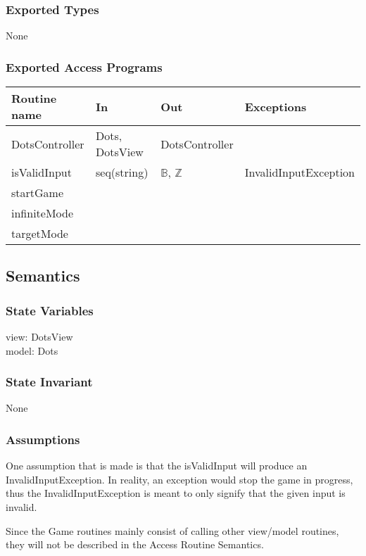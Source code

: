 \documentclass[12pt]{article}
\begin{document}
\subsubsection* {Exported Types}
None

\subsubsection* {Exported Access Programs}

\begin{tabular}{| l | l | l | p{6cm} |}
\hline
\textbf{Routine name} & \textbf{In} & \textbf{Out} & \textbf{Exceptions}\\
\hline
DotsController & Dots, DotsView & DotsController & \\
\hline
isValidInput & seq(string) & $\mathbb{B}$, $\mathbb{Z}$ & InvalidInputException\\
\hline
startGame & ~ & ~ & ~ \\
\hline
infiniteMode & ~ & ~ & ~ \\
\hline
targetMode & ~ & ~ & ~ \\
\hline
\end{tabular}

\subsection* {Semantics}

\subsubsection* {State Variables}
view: DotsView\\
model: Dots

\subsubsection* {State Invariant}
None

\subsubsection* {Assumptions}
One assumption that is made is that the isValidInput will produce an InvalidInputException. In reality, an exception would stop the game in progress, thus the InvalidInputException is meant to only signify that the given input is invalid.

Since the Game routines mainly consist of calling other view/model routines, they will not be described in the Access Routine Semantics.
\end{document}
